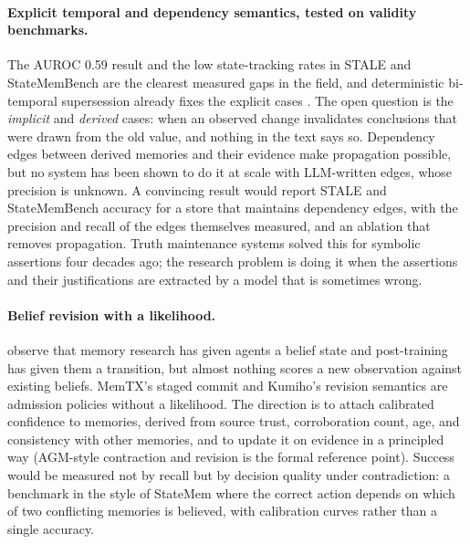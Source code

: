 \documentclass[11pt]{article}
\begin{document}
\paragraph{Explicit temporal and dependency semantics, tested on validity benchmarks.}
The AUROC 0.59 result \citep{yadav2026memstrata} and the low state-tracking rates in STALE and StateMemBench are the clearest measured gaps in the field, and deterministic bi-temporal supersession already fixes the explicit cases \citep{yadav2026memstrata,rasmussen2025zep}. The open question is the \emph{implicit} and \emph{derived} cases: when an observed change invalidates conclusions that were drawn from the old value, and nothing in the text says so. Dependency edges between derived memories and their evidence \citep{fan2026statemem,park2026kumiho} make propagation possible, but no system has been shown to do it at scale with LLM-written edges, whose precision is unknown. A convincing result would report STALE and StateMemBench accuracy for a store that maintains dependency edges, with the precision and recall of the edges themselves measured, and an ablation that removes propagation. Truth maintenance systems \citep{doyle1979tms} solved this for symbolic assertions four decades ago; the research problem is doing it when the assertions and their justifications are extracted by a model that is sometimes wrong.

\paragraph{Belief revision with a likelihood.}
\citet{huang2026belief} observe that memory research has given agents a belief state and post-training has given them a transition, but almost nothing scores a new observation against existing beliefs. MemTX's staged commit and Kumiho's revision semantics are admission policies without a likelihood. The direction is to attach calibrated confidence to memories, derived from source trust, corroboration count, age, and consistency with other memories, and to update it on evidence in a principled way (AGM-style contraction and revision \citep{alchourron1985agm} is the formal reference point). Success would be measured not by recall but by decision quality under contradiction: a benchmark in the style of StateMem where the correct action depends on which of two conflicting memories is believed, with calibration curves rather than a single accuracy.
\end{document}
